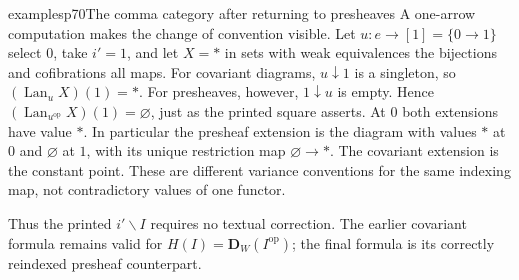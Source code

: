 \begin{dcomment}{examples}{p70}{The comma category after returning to presheaves}
A one-arrow computation makes the change of convention visible. Let $u:e\to[1]=\{0\to1\}$ select $0$, take $i'=1$, and let $X=*$ in sets with weak equivalences the bijections and cofibrations all maps. For covariant diagrams, $u\downarrow1$ is a singleton, so $(\operatorname{Lan}_u X)(1)=*$. For presheaves, however, $1\downarrow u$ is empty. Hence $(\operatorname{Lan}_{u^{\mathrm{op}}}X)(1)=\varnothing$, just as the printed square asserts. At $0$ both extensions have value $*$. In particular the presheaf extension is the diagram with values $*$ at $0$ and $\varnothing$ at $1$, with its unique restriction map $\varnothing\to *$. The covariant extension is the constant point. These are different variance conventions for the same indexing map, not contradictory values of one functor.

Thus the printed $i'\backslash I$ requires no textual correction. The earlier covariant formula remains valid for $H(I)=\mathbf D_W(I^{\mathrm{op}})$; the final formula is its correctly reindexed presheaf counterpart.
\end{dcomment}
